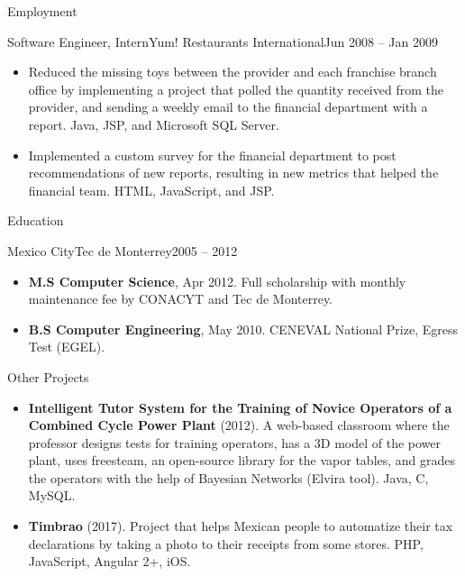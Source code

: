 \documentclass[calibri]{../macdowell-cv/mcdowellcv}
\begin{document}
\begin{cvsection}{Employment}
		\begin{cvsubsection}{Software Engineer, Intern}{Yum! Restaurants International}{Jun 2008 -- Jan 2009}
			\begin{itemize}
				\item Reduced the missing toys between the provider and each franchise branch office by implementing a project that polled the quantity received from the provider, and sending a weekly email to the financial department with a report. Java, JSP, and Microsoft SQL Server.
				\item Implemented a custom survey for the financial department to post recommendations of new reports, resulting in new metrics that helped the financial team. HTML, JavaScript, and JSP.
			\end{itemize}
		\end{cvsubsection}
	\end{cvsection}

	\begin{cvsection}{Education}
		\begin{cvsubsection}{Mexico City}{Tec de Monterrey}{2005 -- 2012}
			\begin{itemize}
				\item \textbf{M.S Computer Science}, Apr 2012. Full scholarship with monthly maintenance fee by CONACYT and Tec de Monterrey.
				\item \textbf{B.S Computer Engineering}, May 2010. CENEVAL National Prize, Egress Test (EGEL).
			\end{itemize}
		\end{cvsubsection}
	\end{cvsection}
	
	\begin{cvsection}{Other Projects}
		\begin{cvsubsection}{}{}{}	
			\begin{itemize}
				\item \textbf{Intelligent Tutor System for the Training of Novice Operators of a Combined Cycle Power Plant} (2012). A web-based classroom where the professor designs tests for training operators, has a 3D model of the power plant, uses freesteam, an open-source library for the vapor tables, and grades the operators with the help of Bayesian Networks (Elvira tool). Java, C, MySQL.
				\item \textbf{Timbrao} (2017). Project that helps Mexican people to automatize their tax declarations by taking a photo to their receipts from some stores. PHP, JavaScript, Angular 2+, iOS.
			\end{itemize}
		\end{cvsubsection}
	\end{cvsection}
	
\end{document}
